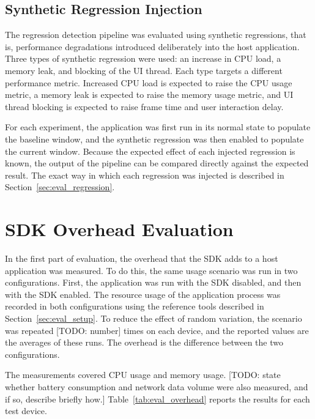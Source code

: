\subsection{Synthetic Regression Injection}

The regression detection pipeline was evaluated using synthetic regressions, that is, performance degradations introduced deliberately into the host application. Three types of synthetic regression were used: an increase in CPU load, a memory leak, and blocking of the UI thread. Each type targets a different performance metric. Increased CPU load is expected to raise the CPU usage metric, a memory leak is expected to raise the memory usage metric, and UI thread blocking is expected to raise frame time and user interaction delay.

For each experiment, the application was first run in its normal state to populate the baseline window, and the synthetic regression was then enabled to populate the current window. Because the expected effect of each injected regression is known, the output of the pipeline can be compared directly against the expected result. The exact way in which each regression was injected is described in Section~\ref{sec:eval_regression}.

\section{SDK Overhead Evaluation}
\label{sec:eval_overhead}
In the first part of evaluation, the overhead that the SDK adds to a host application was measured. To do this, the same usage scenario was run in two configurations. First, the application was run with the SDK disabled, and then with the SDK enabled.
The resource usage of the application process was recorded in both configurations using the reference tools described in Section~\ref{sec:eval_setup}. To reduce the effect of random variation, the scenario was repeated [TODO: number] times on each device, and the reported values are the averages of these runs. The overhead is the difference between the two configurations.

The measurements covered CPU usage and memory usage. [TODO: state whether battery consumption and network data volume were also measured, and if so, describe briefly how.] Table~\ref{tab:eval_overhead} reports the results for each test device.

